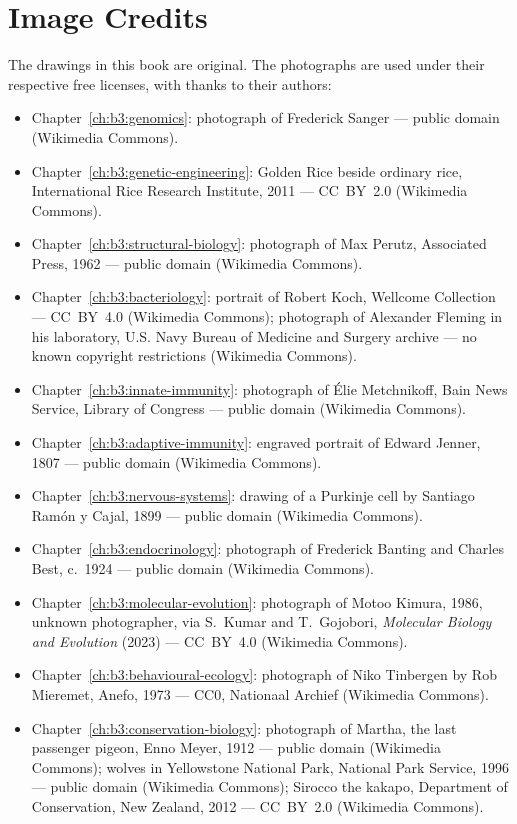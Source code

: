 \chapter*{Image Credits}

The drawings in this book are original. The photographs are used
under their respective free licenses, with thanks to their authors:

\begin{itemize}
  \item Chapter~\ref{ch:b3:genomics}: photograph of Frederick Sanger ---
        public domain (Wikimedia Commons).
  \item Chapter~\ref{ch:b3:genetic-engineering}: Golden Rice beside
        ordinary rice, International Rice Research Institute, 2011 ---
        CC~BY~2.0 (Wikimedia Commons).
  \item Chapter~\ref{ch:b3:structural-biology}: photograph of Max
        Perutz, Associated Press, 1962 --- public domain (Wikimedia
        Commons).
  \item Chapter~\ref{ch:b3:bacteriology}: portrait of Robert Koch,
        Wellcome Collection --- CC~BY~4.0 (Wikimedia Commons);
        photograph of Alexander Fleming in his laboratory, U.S. Navy
        Bureau of Medicine and Surgery archive --- no known copyright
        restrictions (Wikimedia Commons).
  \item Chapter~\ref{ch:b3:innate-immunity}: photograph of Élie
        Metchnikoff, Bain News Service, Library of Congress --- public
        domain (Wikimedia Commons).
  \item Chapter~\ref{ch:b3:adaptive-immunity}: engraved portrait of
        Edward Jenner, 1807 --- public domain (Wikimedia Commons).
  \item Chapter~\ref{ch:b3:nervous-systems}: drawing of a Purkinje cell
        by Santiago Ramón y Cajal, 1899 --- public domain (Wikimedia
        Commons).
  \item Chapter~\ref{ch:b3:endocrinology}: photograph of Frederick
        Banting and Charles Best, c.~1924 --- public domain (Wikimedia
        Commons).
  \item Chapter~\ref{ch:b3:molecular-evolution}: photograph of Motoo
        Kimura, 1986, unknown photographer, via S.~Kumar and T.~Gojobori,
        \emph{Molecular Biology and Evolution} (2023) --- CC~BY~4.0
        (Wikimedia Commons).
  \item Chapter~\ref{ch:b3:behavioural-ecology}: photograph of Niko
        Tinbergen by Rob Mieremet, Anefo, 1973 --- CC0, Nationaal Archief
        (Wikimedia Commons).
  \item Chapter~\ref{ch:b3:conservation-biology}: photograph of Martha,
        the last passenger pigeon, Enno Meyer, 1912 --- public domain
        (Wikimedia Commons); wolves in Yellowstone National Park,
        National Park Service, 1996 --- public domain (Wikimedia
        Commons); Sirocco the kakapo, Department of Conservation, New
        Zealand, 2012 --- CC~BY~2.0 (Wikimedia Commons).
\end{itemize}


